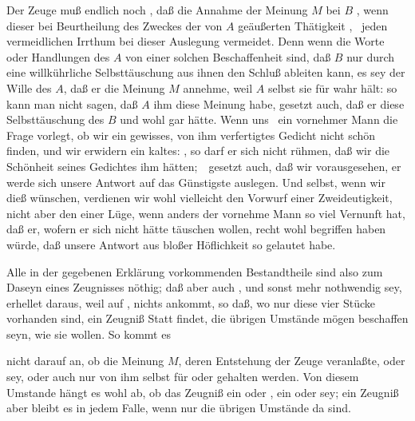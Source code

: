 \begin{aufza}
\begin{aufzb}
\begin{aufzc}
\item Der Zeuge muß endlich noch , daß die Annahme der Meinung $M$ bei $B$ , wenn dieser bei Beurtheilung des Zweckes der von $A$ geäußerten Thätigkeit , \dh\ jeden vermeidlichen Irrthum bei dieser Auslegung vermeidet. Denn wenn die Worte oder Handlungen des $A$ von einer solchen Beschaffenheit sind, daß $B$ nur durch eine willkührliche Selbsttäuschung aus ihnen den Schluß ableiten kann, es sey der Wille des $A$, daß er die Meinung $M$ annehme, weil $A$ selbst sie für wahr hält: so kann man nicht sagen, daß $A$ ihm diese Meinung  habe, gesetzt auch, daß er diese Selbsttäuschung des $B$  und wohl gar  hätte. Wenn uns \zB\ ein vornehmer Mann die Frage vorlegt, ob wir ein gewisses, von ihm verfertigtes Gedicht nicht schön finden, und wir erwidern ein kaltes: , so darf er sich nicht rühmen, daß wir die Schönheit seines Gedichtes ihm  hätten;~\ gesetzt auch, daß wir vorausgesehen, er werde sich unsere Antwort auf das Günstigste auslegen. Und selbst, wenn wir dieß wünschen, verdienen wir wohl vielleicht den Vorwurf einer Zweideutigkeit, nicht aber den einer Lüge, wenn anders der vornehme Mann so viel Vernunft hat, daß er, wofern er sich nicht hätte täuschen wollen, recht wohl begriffen haben würde, daß unsere Antwort aus bloßer Höflichkeit so gelautet habe.
\end{aufzc}
\item Alle in der gegebenen Erklärung vorkommenden Bestandtheile sind also zum Daseyn eines Zeugnisses nöthig; daß aber auch , und sonst  mehr nothwendig sey, erhellet daraus, weil auf , nichts ankommt, so daß, wo nur diese vier Stücke vorhanden sind, ein Zeugniß Statt findet, die übrigen Umstände mögen beschaffen seyn, wie sie wollen. So kommt es
\begin{aufzc}
\item nicht darauf an, ob die Meinung $M$, deren Entstehung der Zeuge veranlaßte,  oder  sey, oder auch nur von ihm selbst für  oder  gehalten werden. Von diesem Umstande hängt es wohl ab, ob das Zeugniß ein  oder , ein  oder  sey; ein Zeugniß aber bleibt es in jedem Falle, wenn nur die übrigen Umstände da sind.

\end{aufzc}
\end{aufzb}
\end{aufza}
